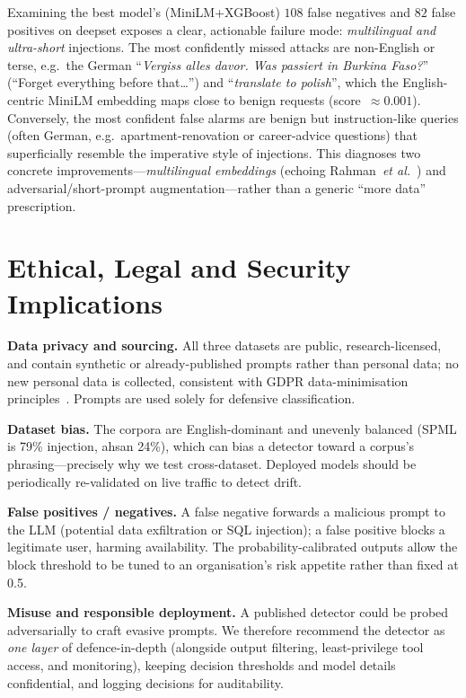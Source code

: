 \documentclass[conference]{IEEEtran}
\begin{document}
Examining the best model's (MiniLM+XGBoost) $108$ false negatives and $82$ false
positives on deepset exposes a clear, actionable failure mode:
\emph{multilingual and ultra-short} injections. The most confidently missed
attacks are non-English or terse, e.g.\ the German
``\emph{Vergiss alles davor. Was passiert in Burkina Faso?}'' (``Forget
everything before that\ldots'') and ``\emph{translate to polish}'', which the
English-centric MiniLM embedding maps close to benign requests
(score~$\approx\!0.001$). Conversely, the most confident false alarms are benign
but instruction-like queries (often German, e.g.\ apartment-renovation or
career-advice questions) that superficially resemble the imperative style of
injections. This diagnoses two concrete improvements---\emph{multilingual
embeddings} (echoing Rahman~\emph{et al.}~\cite{rahman2024multilingual}) and
adversarial/short-prompt augmentation---rather than a generic ``more data''
prescription.

\section{Ethical, Legal and Security Implications}\label{sec:ethics}
\textbf{Data privacy and sourcing.} All three datasets are public,
research-licensed, and contain synthetic or already-published prompts rather than
personal data; no new personal data is collected, consistent with GDPR
data-minimisation principles~\cite{gdpr2016}. Prompts are used solely for defensive
classification.

\textbf{Dataset bias.} The corpora are English-dominant and unevenly balanced
(SPML is 79\% injection, ahsan 24\%), which can bias a detector toward a
corpus's phrasing---precisely why we test cross-dataset. Deployed models should
be periodically re-validated on live traffic to detect drift.

\textbf{False positives / negatives.} A false negative forwards a malicious
prompt to the LLM (potential data exfiltration or SQL injection); a false
positive blocks a legitimate user, harming availability. The
probability-calibrated outputs allow the block threshold to be tuned to an
organisation's risk appetite rather than fixed at 0.5.

\textbf{Misuse and responsible deployment.} A published detector could be probed
adversarially to craft evasive prompts. We therefore recommend the detector as
\emph{one layer} of defence-in-depth (alongside output filtering,
least-privilege tool access, and monitoring), keeping decision thresholds and model
details confidential, and logging decisions for auditability.
\end{document}

